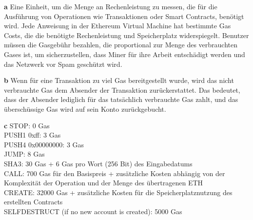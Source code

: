 \documentclass[german]{../uebung}
\begin{document}
\begin{exercise}{2}

    \textbf{a}
    Eine Einheit, um die Menge an Rechenleistung zu messen, die für die Ausführung von Operationen wie Transaktionen oder Smart Contracts, benötigt wird. Jede Anweisung in der Ethereum Virtual Machine hat bestimmte Gas Costs, die die benötigte Rechenleistung und Speicherplatz widerspiegelt. Benutzer müssen die Gasgebühr bezahlen, die proportional zur Menge des verbrauchten Gases ist, um sicherzustellen, dass Miner für ihre Arbeit entschädigt werden und das Netzwerk vor Spam geschützt wird.

    \textbf{b}
    Wenn für eine Transaktion zu viel Gas bereitgestellt wurde, wird das nicht verbrauchte Gas dem Absender der Transaktion zurückerstattet. Das bedeutet, dass der Absender lediglich für das tatsächlich verbrauchte Gas zahlt, und das überschüssige Gas wird auf sein Konto zurückgebucht.

    \textbf{c}
    STOP: 0 Gas\\
    PUSH1 0xff: 3 Gas\\
    PUSH4 0x00000000: 3 Gas\\
    JUMP: 8 Gas\\
    SHA3: 30 Gas + 6 Gas pro Wort (256 Bit) des Eingabedatums\\
    CALL: 700 Gas für den Basispreis + zusätzliche Kosten abhängig von der Komplexität der Operation und der Menge des übertragenen ETH\\
    CREATE: 32000 Gas + zusätzliche Kosten für die Speicherplatznutzung des erstellten Contracts\\
    SELFDESTRUCT (if no new account is created): 5000 Gas
\end{exercise}
\end{document}

